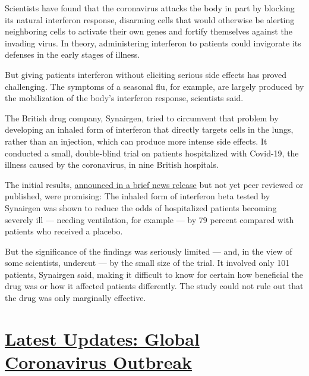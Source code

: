 Scientists have found that the coronavirus attacks the body in part by
blocking its natural interferon response, disarming cells that would
otherwise be alerting neighboring cells to activate their own genes and
fortify themselves against the invading virus. In theory, administering
interferon to patients could invigorate its defenses in the early stages
of illness.

But giving patients interferon without eliciting serious side effects
has proved challenging. The symptoms of a seasonal flu, for example, are
largely produced by the mobilization of the body's interferon response,
scientists said.

The British drug company, Synairgen, tried to circumvent that problem by
developing an inhaled form of interferon that directly targets cells in
the lungs, rather than an injection, which can produce more intense side
effects. It conducted a small, double-blind trial on patients
hospitalized with Covid-19, the illness caused by the coronavirus, in
nine British hospitals.

The initial results,
\href{https://www.synairgen.com/wp-content/uploads/2020/07/200720-Synairgen-announces-positive-results-from-trial-of-SNG001-in-hospitalised-COVID-19-patients.pdf}{announced
in a brief news release} but not yet peer reviewed or published, were
promising: The inhaled form of interferon beta tested by Synairgen was
shown to reduce the odds of hospitalized patients becoming severely ill
--- needing ventilation, for example --- by 79 percent compared with
patients who received a placebo.

But the significance of the findings was seriously limited --- and, in
the view of some scientists, undercut --- by the small size of the
trial. It involved only 101 patients, Synairgen said, making it
difficult to know for certain how beneficial the drug was or how it
affected patients differently. The study could not rule out that the
drug was only marginally effective.

\hypertarget{latest-updates-global-coronavirus-outbreak}{%
\section{\texorpdfstring{\href{https://www.nytimes.com/2020/08/04/world/coronavirus-cases.html?action=click\&pgtype=Article\&state=default\&region=MAIN_CONTENT_1\&context=storylines_live_updates}{Latest
Updates: Global Coronavirus
Outbreak}}{Latest Updates: Global Coronavirus Outbreak}}\label{latest-updates-global-coronavirus-outbreak}}

